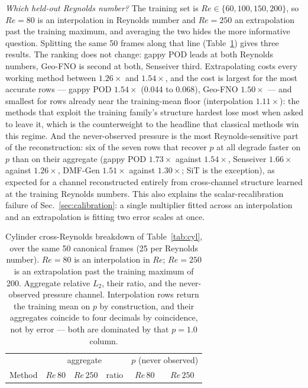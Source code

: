 \documentclass[aip,pof,reprint,amsmath,amssymb,superscriptaddress]{revtex4-1}
\newcommand{\dmfgen}{DMF-Gen}
\begin{document}
\emph{Which held-out Reynolds number?} The training set is
$Re\in\{60,100,150,200\}$, so $Re=80$ is an interpolation in Reynolds number
and $Re=250$ an extrapolation past the training maximum, and averaging the
two hides the more informative question. Splitting the same 50 frames along
that line (Table~\ref{tab:crossre}) gives three results. The ranking does not
change: gappy POD leads at both Reynolds numbers, Geo-FNO is second at both,
Senseiver third. Extrapolating costs every working method between
$1.26\times$ and $1.54\times$, and the cost is largest for the most accurate
rows --- gappy POD $1.54\times$ (0.044 to 0.068), Geo-FNO $1.50\times$ --- and
smallest for rows already near the training-mean floor (interpolation
$1.11\times$): the methods that exploit the training family's structure
hardest lose most when asked to leave it, which is the counterweight to the
headline that classical methods win this regime. And the never-observed
pressure is the most Reynolds-sensitive part of the reconstruction: six of the
seven rows that recover $p$ at all degrade faster on $p$ than on their
aggregate (gappy POD $1.73\times$ against $1.54\times$, Senseiver $1.66\times$
against $1.26\times$, \dmfgen{} $1.51\times$ against $1.30\times$; SiT is the
exception), as expected for a channel reconstructed entirely from
cross-channel structure learned at the training Reynolds numbers. This also
explains the scalar-recalibration failure of Sec.~\ref{sec:calibration}: a
single multiplier fitted across an interpolation and an extrapolation is
fitting two error scales at once.

\begin{table}[tbp]
\caption{\label{tab:crossre}Cylinder cross-Reynolds breakdown of
Table~\ref{tab:cyl}, over the same 50 canonical frames (25 per Reynolds
number). $Re=80$ is an interpolation in $Re$; $Re=250$ is an extrapolation past
the training maximum of 200. Aggregate relative $L_2$, their ratio, and the
never-observed pressure channel. Interpolation rows return the training mean on
$p$ by construction, and their aggregates coincide to four decimals by
coincidence, not by error --- both are dominated by that $p{=}1.0$ column.}
\footnotesize
\begin{ruledtabular}
\begin{tabular}{lccccc}
 & \multicolumn{3}{c}{aggregate} & \multicolumn{2}{c}{$p$ (never observed)} \\
Method & $Re\,80$ & $Re\,250$ & ratio & $Re\,80$ & $Re\,250$ \\
\hline

\end{tabular}
\end{ruledtabular}
\end{table}
\end{document}
